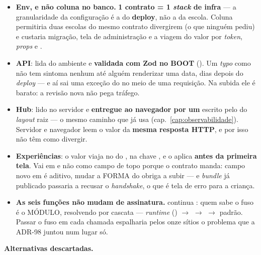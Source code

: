 \begin{itemize}
  \item \textbf{Env, e não coluna no banco.} \textbf{1 contrato = 1 \emph{stack}
    de infra} --- a granularidade da configuração é a do \textbf{deploy}, não a
    da escola. Coluna permitiria duas escolas do mesmo contrato divergirem (o
    que ninguém pediu) e custaria migração, tela de administração e a viagem do
    valor por \emph{token}, \emph{props} e .
  \item \textbf{API}: lida do ambiente e \textbf{validada com Zod no BOOT}
    (). Um \emph{typo} como
     não tem sintoma nenhum até alguém renderizar uma data,
    dias depois do \emph{deploy} --- e aí sai uma exceção do  no meio
    de uma requisição. Na subida ele é barato: a revisão nova não pega tráfego.
  \item \textbf{Hub}: lido no servidor e \textbf{entregue ao navegador por um
    } escrito pelo  do
    \emph{layout} raiz --- o mesmo caminho que  já usa
    (cap.~\ref{cap:observabilidade}). Servidor e navegador leem o valor da
    \textbf{mesma resposta HTTP}, e por isso não têm como divergir.
  \item \textbf{Experiências}: o valor viaja no  do , na
    chave , e  o aplica \textbf{antes da primeira
    tela}. Vai em  e não como campo de topo porque o contrato manda:
    campo novo em  é aditivo, mudar a FORMA do  obriga a
    subir  --- e \emph{bundle} já publicado passaria a
    recusar o \emph{handshake}, o que é tela de erro para a criança.
  \item \textbf{As seis funções não mudam de assinatura.} 
    continua : quem sabe o fuso é o MÓDULO, resolvendo por cascata
    --- \emph{runtime} () $\rightarrow$ 
    $\rightarrow$  $\rightarrow$ padrão. Passar o fuso em cada chamada
    espalharia pelos onze sítios o problema que a ADR-98 juntou num lugar só.
\end{itemize}

\textbf{Alternativas descartadas.}

